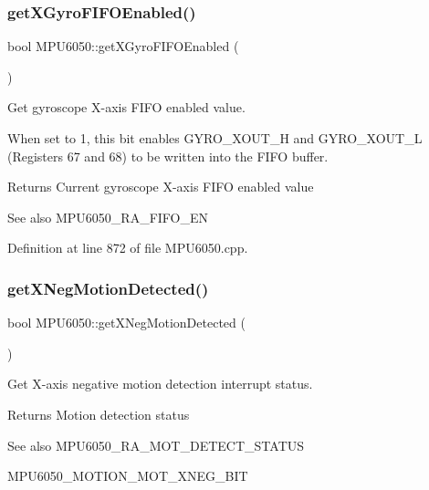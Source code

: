 \subsubsection{\texorpdfstring{getXGyroFIFOEnabled()}{getXGyroFIFOEnabled()}}
{\footnotesize\ttfamily bool M\+P\+U6050\+::get\+X\+Gyro\+F\+I\+F\+O\+Enabled (\begin{DoxyParamCaption}{ }\end{DoxyParamCaption})}



Get gyroscope X-\/axis F\+I\+FO enabled value. 

When set to 1, this bit enables G\+Y\+R\+O\+\_\+\+X\+O\+U\+T\+\_\+H and G\+Y\+R\+O\+\_\+\+X\+O\+U\+T\+\_\+L (Registers 67 and 68) to be written into the F\+I\+FO buffer. \begin{DoxyReturn}{Returns}
Current gyroscope X-\/axis F\+I\+FO enabled value 
\end{DoxyReturn}
\begin{DoxySeeAlso}{See also}
M\+P\+U6050\+\_\+\+R\+A\+\_\+\+F\+I\+F\+O\+\_\+\+EN 
\end{DoxySeeAlso}


Definition at line 872 of file M\+P\+U6050.\+cpp.

\mbox{\label{classMPU6050_a446d235905783c5b90637a6b6792ac76}} 
\subsubsection{\texorpdfstring{getXNegMotionDetected()}{getXNegMotionDetected()}}
{\footnotesize\ttfamily bool M\+P\+U6050\+::get\+X\+Neg\+Motion\+Detected (\begin{DoxyParamCaption}{ }\end{DoxyParamCaption})}



Get X-\/axis negative motion detection interrupt status. 

\begin{DoxyReturn}{Returns}
Motion detection status 
\end{DoxyReturn}
\begin{DoxySeeAlso}{See also}
M\+P\+U6050\+\_\+\+R\+A\+\_\+\+M\+O\+T\+\_\+\+D\+E\+T\+E\+C\+T\+\_\+\+S\+T\+A\+T\+US 

M\+P\+U6050\+\_\+\+M\+O\+T\+I\+O\+N\+\_\+\+M\+O\+T\+\_\+\+X\+N\+E\+G\+\_\+\+B\+IT 
\end{DoxySeeAlso}



